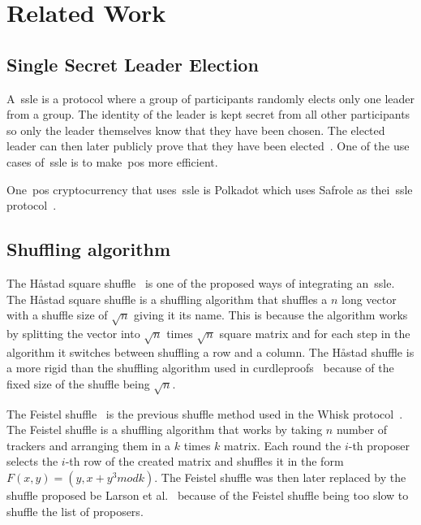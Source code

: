 \section{Related Work}\label{sec:related-work}




\subsection{Single Secret Leader Election}\label{sec:related-work-SSLE}
A~\gls{ssle} is a protocol where a group of participants randomly elects only one leader from a group.
The identity of the leader is kept secret from all other participants so only the leader themselves know that they have been chosen.
The elected leader can then later publicly prove that they have been elected~\cite{10.1145/3419614.3423258}.
One of the use cases of~\gls{ssle} is to make~\gls{pos} more efficient.

One~\gls{pos} cryptocurrency that uses~\gls{ssle} is Polkadot which uses Safrole as thei~\gls{ssle} protocol~\cite{polkadot}.



\subsection{Shuffling algorithm}\label{sec:related-work-Shuffling-algorithm}

The Håstad square shuffle~\cite{haastad2006square} is one of the proposed ways of integrating an~\gls{ssle}.
The Håstad square shuffle is a shuffling algorithm that shuffles a $n$ long vector with a shuffle size of $\sqrt {n}$ giving it its name.
This is because the algorithm works by splitting the vector into $\sqrt {n}$ times $\sqrt {n}$ square matrix and for each step in the algorithm it switches between shuffling a row and a column.
The Håstad shuffle is a more rigid than the shuffling algorithm used in curdleproofs~\cite{cryptoeprint:2022/560} because of the fixed size of the shuffle being $\sqrt {n}$.

The Feistel shuffle~\cite{Feistle} is the previous shuffle method used in the Whisk protocol~\cite{Whisk2024}.
The Feistel shuffle is a shuffling algorithm that works by taking $n$ number of trackers and arranging them in a $k$ times $k$ matrix.
Each round the $i$-th proposer selects the $i$-th row of the created matrix and shuffles it in the form $F(x,y)=(y,x+y^3 mod k)$.
The Feistel shuffle was then later replaced by the shuffle proposed be Larson et al.~\cite{cryptoeprint:2022/560} because of the Feistel shuffle being too slow to shuffle the list of proposers.


